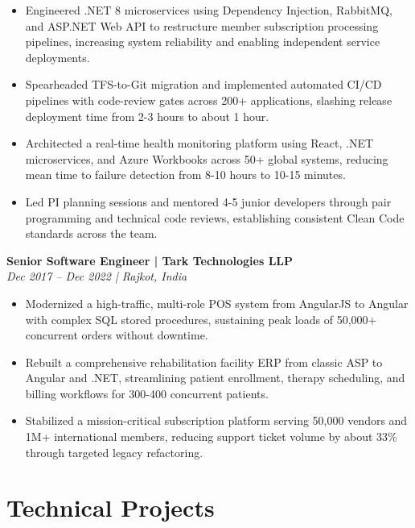 \documentclass[letterpaper,10pt]{article}
\begin{document}
\begin{itemize}[leftmargin=0.15in,topsep=2pt,itemsep=2pt,parsep=0pt]
\item\small{Engineered .NET 8 microservices using Dependency Injection, RabbitMQ, and ASP.NET Web API to restructure member subscription processing pipelines, increasing system reliability and enabling independent service deployments.}
\item\small{Spearheaded TFS-to-Git migration and implemented automated CI/CD pipelines with code-review gates across 200+ applications, slashing release deployment time from 2-3 hours to about 1 hour.}
\item\small{Architected a real-time health monitoring platform using React, .NET microservices, and Azure Workbooks across 50+ global systems, reducing mean time to failure detection from 8-10 hours to 10-15 minutes.}
\item\small{Led PI planning sessions and mentored 4-5 junior developers through pair programming and technical code reviews, establishing consistent Clean Code standards across the team.}
\end{itemize}

\noindent\textbf{Senior Software Engineer | Tark Technologies LLP}\\
{\small\textit{Dec 2017 – Dec 2022 | Rajkot, India}}\\[-2pt]

\begin{itemize}[leftmargin=0.15in,topsep=2pt,itemsep=2pt,parsep=0pt]
\item\small{Modernized a high-traffic, multi-role POS system from AngularJS to Angular with complex SQL stored procedures, sustaining peak loads of 50,000+ concurrent orders without downtime.}
\item\small{Rebuilt a comprehensive rehabilitation facility ERP from classic ASP to Angular and .NET, streamlining patient enrollment, therapy scheduling, and billing workflows for 300-400 concurrent patients.}
\item\small{Stabilized a mission-critical subscription platform serving 50,000 vendors and 1M+ international members, reducing support ticket volume by about 33\% through targeted legacy refactoring.}
\end{itemize}


\section{Technical Projects}
\end{document}
